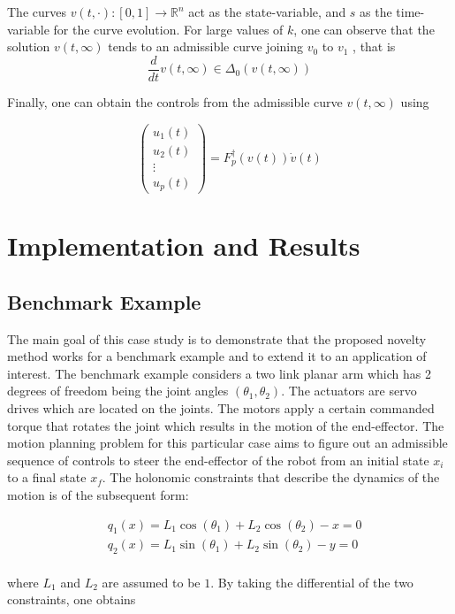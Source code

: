 \documentclass[letterpaper, 10 pt, conference]{ieeeconf}
\begin{document}
The curves $v(t, \cdot):[0,1] \rightarrow \mathbb{R}^{n}$ act as the state-variable, and $s$ as the time-variable for the curve evolution. For large values of $k$, one can observe that the solution $v(t, \infty)$ tends to an admissible curve joining $v_{0}$ to $v_{1}$ \cite{PAPER1}, that is
\begin{equation}
\frac{d}{d t} v(t, \infty) \in \Delta_{0}(v(t, \infty))
\end{equation}

Finally, one can obtain the controls from the admissible curve $v(t, \infty)$ using

\begin{equation}
\left(\begin{array}{c}
u_{1}(t) \\
u_{2}(t) \\
\vdots \\
u_{p}(t)
\end{array}\right)=F_{p}^{\dagger}(v(t)) \dot{v}(t)
\end{equation}

\section{\textbf{Implementation and Results}}
\subsection{Benchmark Example}

The main goal of this case study is to demonstrate that the proposed novelty method works for a benchmark example and to extend it to an application of interest. The benchmark example considers a two link planar arm which has 2 degrees of freedom being the joint angles $(\theta_1, \theta_2)$. The actuators are servo drives which are located on the joints. The motors apply a certain commanded torque that rotates the joint which results in the motion of the end-effector. The motion planning problem for this particular case aims to figure out an admissible sequence of controls to steer the end-effector of the robot from an initial state $x_i$ to a final state $x_f$. The holonomic constraints that describe the dynamics of the motion is of the subsequent form:
 
\begin{equation}
\begin{aligned}
&q_{1}(x)= L_{1} \cos \left(\theta_{1}\right)+L_{2} \cos \left(\theta_{2}\right)-x=0 \\
&q_{2}(x)= L_{1} \sin \left(\theta_{1}\right)+L_{2} \sin \left(\theta_{2}\right)-y=0
\end{aligned}
\end{equation}
\\
where $L_{1}$ and $L_{2}$ are assumed to be $1$. By taking the differential of the two constraints, one obtains
\end{document}
